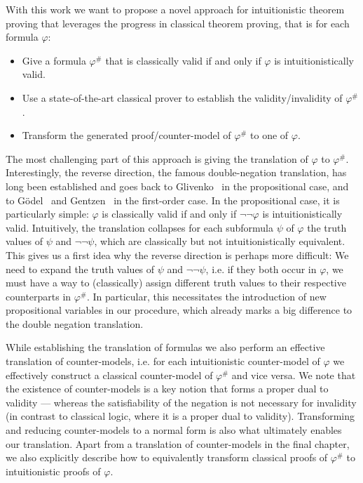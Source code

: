 \documentclass[a4paper,11pt]{report}
\theoremstyle{definition}
\theoremstyle{definition}
\theoremstyle{definition}
\theoremstyle{definition}
\theoremstyle{definition}
\theoremstyle{definition}
\theoremstyle{definition}
\begin{document}
	With this work we want to propose a novel approach for intuitionistic theorem proving that leverages the progress in classical theorem proving, that is for each formula $\varphi$:
	\begin{itemize}
		\item Give a formula $\varphi^\#$ that is classically valid if and only if $\varphi$ is intuitionistically valid.
		\item Use a state-of-the-art classical prover to establish the validity/invalidity of $\varphi^\#$.
		\item Transform the generated proof/counter-model of $\varphi^\#$ to one of $\varphi$.
	\end{itemize}
	The most challenging part of this approach is giving the translation of $\varphi$ to $\varphi^\#$.
	Interestingly, the reverse direction, the famous double-negation translation, has long been established and goes back to Glivenko~\cite{glivenko1929quelques} in the propositional case, and to G\"odel~\cite{godel1933intuitionistischen} and Gentzen~\cite{gentzen1936widerspruchsfreiheit} in the first-order case. In the propositional case, it is particularly simple: $\varphi$ is classically valid if and only if $\neg\neg\varphi$ is intuitionistically valid. Intuitively, the translation collapses for each subformula $\psi$ of $\varphi$ the truth values of $\psi$ and $\neg\neg\psi$, which are classically but not intuitionistically equivalent. This gives us a first idea why the reverse direction is perhaps more difficult: We need to expand the truth values of $\psi$ and $\neg\neg\psi$, i.e. if they both occur in $\varphi$, we must have a way to (classically) assign different truth values to their respective counterparts in $\varphi^\#$. In particular, this necessitates the introduction of new propositional variables in our procedure, which already marks a big difference to the double negation translation.
	
	While establishing the translation of formulas we also perform an effective translation of counter-models, i.e. for each intuitionistic counter-model of $\varphi$ we effectively construct a classical counter-model of $\varphi^\#$ and vice versa.
	We note that the existence of counter-models is a key notion that forms a proper dual to validity --- whereas the satisfiability of the negation is not necessary for invalidity (in contrast to classical logic, where it is a proper dual to validity).
	Transforming and reducing counter-models to a normal form is also what ultimately enables our translation. Apart from a translation of counter-models in the final chapter, we also explicitly describe how to equivalently transform classical proofs of $\varphi^\#$ to intuitionistic proofs of $\varphi$.
	
\end{document}
